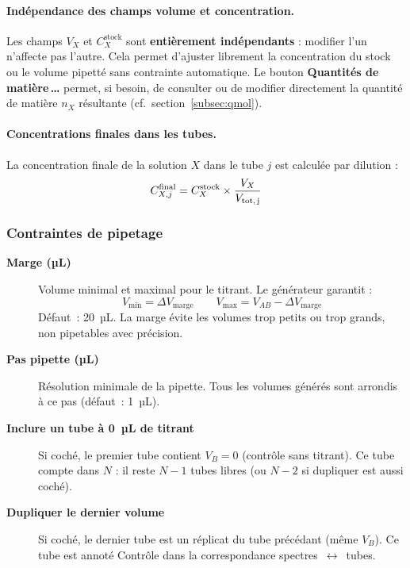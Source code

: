 \documentclass[12pt, a4paper]{article}
\begin{document}
\paragraph{Indépendance des champs volume et concentration.}
Les champs $V_X$ et $C_X^\text{stock}$ sont \textbf{entièrement indépendants} :
modifier l'un n'affecte pas l'autre. Cela permet d'ajuster librement la
concentration du stock ou le volume pipetté sans contrainte automatique.
Le bouton \textbf{Quantités de matière\,\ldots} permet, si besoin, de
consulter ou de modifier directement la quantité de matière $n_X$ résultante
(cf.\ section~\ref{subsec:qmol}).

\paragraph{Concentrations finales dans les tubes.}
La concentration finale de la solution $X$ dans le tube $j$ est calculée
par dilution :
\[
C_{X,j}^\text{final} = C_X^\text{stock} \times \frac{V_X}{V_\text{tot,\,j}}
\]

\subsubsection{Contraintes de pipetage}

\begin{description}
  \item[\textbf{Marge (µL)}] Volume minimal et maximal pour le titrant. Le
        générateur garantit :
        \[
          V_\text{min} = \Delta V_\text{marge}
          \qquad
          V_\text{max} = V_{AB} - \Delta V_\text{marge}
        \]
        Défaut~: 20~µL. La marge évite les volumes trop petits ou trop
        grands, non pipetables avec précision.

  \item[\textbf{Pas pipette (µL)}] Résolution minimale de la pipette. Tous
        les volumes générés sont arrondis à ce pas (défaut~: 1~µL).

  \item[\textbf{Inclure un tube à 0~µL de titrant}] Si coché, le premier
        tube contient $V_B = 0$ (contrôle sans titrant). Ce tube compte dans
        $N$ : il reste $N - 1$ tubes libres (ou $N - 2$ si \og dupliquer\fg{}
        est aussi coché).

  \item[\textbf{Dupliquer le dernier volume}] Si coché, le dernier tube est
        un réplicat du tube précédant (même $V_B$). Ce tube est annoté
        \og Contrôle\fg{} dans la correspondance spectres~$\leftrightarrow$~tubes.
\end{description}
\end{document}
